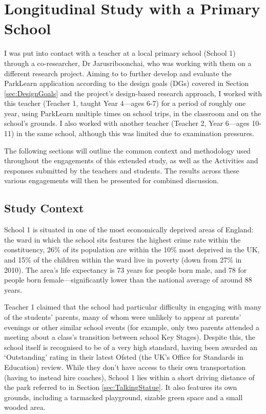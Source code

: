 \section{Longitudinal Study with a Primary School}
\label{sec:LongitudinalSchool}

I was put into contact with a teacher at a local primary school (School 1) through a co-researcher, Dr Jarusriboonchai, who was working with them on a different research project. Aiming to to further develop and evaluate the ParkLearn application according to the design goals (DGs) covered in Section \ref{sec:DesignGoals} and the project's design-based research approach, I worked with this teacher (Teacher 1, taught Year 4---ages 6-7) for a period of roughly one year, using ParkLearn multiple times on school trips, in the classroom and on the school's grounds. I also worked with another teacher (Teacher 2, Year 6---ages 10-11) in the same school, although this was limited due to examination pressures. 

The following sections will outline the common context and methodology used throughout the engagements of this extended study, as well as the Activities and responses submitted by the teachers and students. The results across these various engagements will then be presented for combined discussion.

\subsection{Study Context}
School 1 is situated in one of the most economically deprived areas of England: the ward in which the school sits features the highest crime rate within the constituency, 26\% of its population are within the 10\% most deprived in the UK, and 15\% of the children within the ward live in poverty (down from 27\% in 2010). The area's life expectancy is 73 years for people born male, and 78 for people born female---significantly lower than the national average of around 88 years.

Teacher 1 claimed that the school had particular difficulty in engaging with many of the students' parents, many of whom were unlikely to appear at parents' evenings or other similar school events (for example, only two parents attended a meeting about a class's transition between school Key Stages). Despite this, the school itself is recognised to be of a very high standard, having been awarded an `Outstanding' rating in their latest Ofsted (the UK’s Office for Standards in Education) review. While they don't have access to their own transportation (having to instead hire coaches), School 1 lies within a short driving distance of the park referred to in Section \ref{sec:TalkingStatue}. It also features its own grounds, including a tarmacked playground, sizable green space and a small wooded area.

